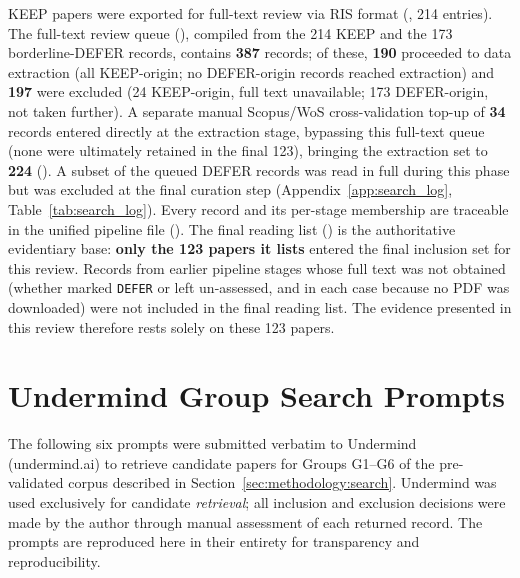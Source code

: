 KEEP papers were exported for full-text review via RIS format
(\texttt{}, 214 entries). The full-text
review queue (\texttt{}),
compiled from the 214 KEEP and the 173 borderline-DEFER records, contains
\textbf{387} records; of these, \textbf{190} proceeded to data extraction (all
KEEP-origin; no DEFER-origin records reached extraction) and \textbf{197} were
excluded (24 KEEP-origin, full text unavailable; 173 DEFER-origin, not taken
further). A
separate manual Scopus/WoS cross-validation top-up of \textbf{34} records
entered directly at the extraction stage, bypassing this full-text queue
(none were ultimately retained in the final 123), bringing the extraction
set to \textbf{224} (\texttt{}). A subset of the
queued DEFER records was read in full during this phase but was excluded at
the final curation step (Appendix~\ref{app:search_log}, Table~\ref{tab:search_log}).
Every record and its per-stage membership are traceable in the unified
pipeline file (\texttt{}). The final reading list
(\texttt{}) is the authoritative
evidentiary base: \textbf{only the 123 papers it lists} entered the final
inclusion set for this review. Records from earlier pipeline stages whose full
text was not obtained (whether marked \texttt{DEFER} or left un-assessed, and
in each case because no PDF was downloaded) were not included in the final
reading list. The evidence presented in this review therefore rests solely on
these 123 papers.


\section[\appendixname~\thesection]{Undermind Group Search Prompts}
\label{app:undermind}

The following six prompts were submitted verbatim to Undermind (undermind.ai) to
retrieve candidate papers for Groups G1--G6 of the pre-validated corpus described in
Section~\ref{sec:methodology:search}. Undermind was used exclusively for candidate
\textit{retrieval}; all inclusion and exclusion decisions were made by the author
through manual assessment of each returned record. The prompts are reproduced here
in their entirety for transparency and reproducibility.

